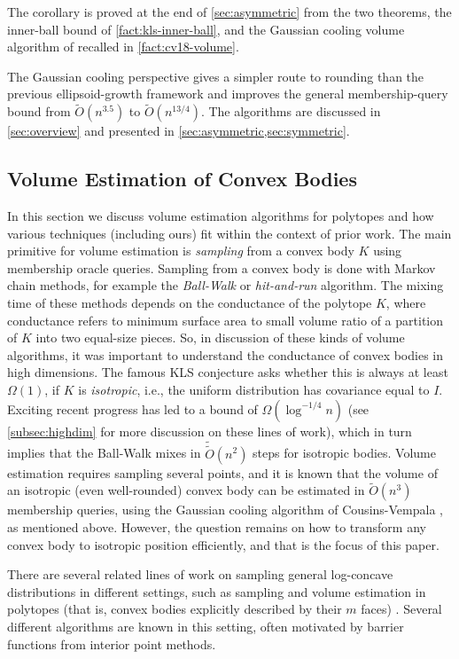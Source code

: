 \documentclass[11pt]{article}
\numberwithin{equation}{section}
\theoremstyle{definition}
\renewcommand{\O}{\widetilde{O}}
\begin{document}
The corollary is proved at the end of \cref{sec:asymmetric} from the two
theorems, the inner-ball bound of \cref{fact:kls-inner-ball}, and the Gaussian
cooling volume algorithm of \cite{CV18:journal} recalled in
\cref{fact:cv18-volume}.

The Gaussian cooling perspective gives a simpler route to rounding than the
previous ellipsoid-growth framework and improves the general membership-query
bound from $\O(n^{3.5})$ to
$\O(n^{13/4})$.
The algorithms are discussed in \cref{sec:overview} and presented in
\cref{sec:asymmetric,sec:symmetric}.

\subsection{Volume Estimation of Convex Bodies}
\label{subsec:polytopes}

In this section we discuss volume estimation algorithms for polytopes and how
various techniques (including ours) fit within the context of prior work.
The main primitive for volume estimation is \emph{sampling} from a convex body
$K$ using membership oracle queries.
Sampling from a convex body is done with Markov chain methods, for example the
\emph{Ball-Walk} or \emph{hit-and-run} algorithm.
The mixing time of these methods depends on the conductance of the polytope $K$,
where conductance refers to minimum surface area to small volume ratio of a
partition of
$K$ into two equal-size pieces.
So, in discussion of these kinds of volume algorithms, it was important to
understand the conductance of convex bodies in high dimensions.
The famous KLS conjecture asks whether this is always at least $\Omega(1)$, if
$K$ is \emph{isotropic}, i.e., the uniform distribution has covariance equal to
$I$.
Exciting recent progress has led to a bound of $\Omega(\log^{-1/4} n)$
\cite{L26:arxiv} (see \cref{subsec:highdim} for more discussion on these lines
of work), which in turn implies that the Ball-Walk mixes in
$\widetilde{\O}(n^2)$ steps for isotropic bodies.
Volume estimation requires sampling several points, and it is known that the
volume of an isotropic (even well-rounded) convex body can be estimated in
$\O(n^3)$ membership queries, using the Gaussian cooling algorithm of
Cousins-Vempala \cite{CV18:journal}, as mentioned above.
However, the question remains on how to transform any convex body to isotropic
position efficiently, and that is the focus of this paper.

There are several related lines of work on sampling general log-concave
distributions in different settings, such as sampling and volume estimation in
polytopes (that is, convex bodies explicitly described by their $m$ faces)
\cite{KN12:journal,N16:journal,NR17:journal,SV16:journal,CDWY17,CDWY18:journal,LLV20,LV22:journal,LV18,KLSV22,KLSV23,GKV24,MV23,GKMSZ24,JC25,GC11:journal}.
Several different algorithms are known in this setting, often motivated by
barrier functions from interior point methods.
\end{document}
